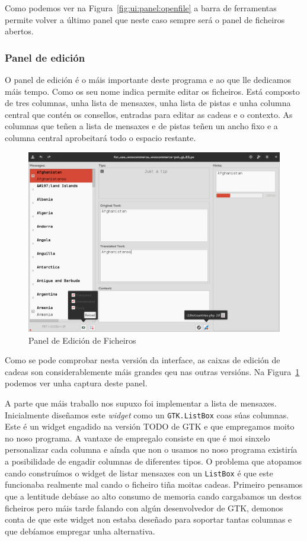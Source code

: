 Como podemos ver na Figura~\ref{fig:ui:panel:openfile} a barra de ferramentas permite volver a último panel que neste caso sempre será o panel de ficheiros abertos.

\subsubsection{Panel de edición}

O panel de edición é o máis importante deste programa e ao que lle dedicamos máis tempo. Como os seu nome indica permite editar os ficheiros. Está composto de tres columnas, unha lista de mensaxes, unha lista de pistas e unha columna central que contén os consellos, entradas para editar as cadeas e o contexto. As columnas que teñen a lista de mensaxes e de pistas teñen un ancho fixo e a columna central aprobeitará todo o espacio restante.

\begin{figure}[hp!]
    \centering
    \includegraphics[angle=90,width=\textwidth]{img/panel_edicion.png}
    \caption{Panel de Edición de Ficheiros}
    \label{fig:ui:panel:edit}
\end{figure}

Como se pode comprobar nesta versión da interface, as caixas de edición de cadeas son considerablemente máis grandes qeu nas outras versións. Na Figura~\ref{fig:ui:panel:edit} podemos ver unha captura deste panel.

A parte que máis traballo nos supuxo foi implementar a lista de mensaxes. Inicialmente diseñamos este \emph{widget} como un \lstinline{GTK.ListBox} coas súas columnas. Este é un widget engadido na versión TODO de GTK e que empregamos moito no noso programa. A vantaxe de empregalo consiste en que é moi sinxelo personalizar cada columna e aínda que non o usamos no noso programa existiría a posibilidade de engadir columnas de diferentes tipos. O problema que atopamos cando construímos o widget de listar mensaxes con un \lstinline{ListBox} é que este funcionaba realmente mal cando o ficheiro tiña moitas cadeas. Primeiro pensamos que a lentitude debíase ao alto consumo de memoria cando cargabamos un destos ficheiros pero máis tarde falando con algún desenvolvedor de GTK, demonos conta de que este widget non estaba deseñado para soportar tantas columnas e que debíamos empregar unha alternativa.

